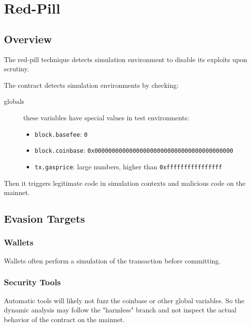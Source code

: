 \section{Red-Pill} \label{sec:red-pill}

\subsection{Overview}

The red-pill technique detects simulation environment to disable its exploits upon scrutiny. 

The contract detects simulation environments by checking:

\begin{description}
\item[globals]{these variables have special values in test environments:
\begin{itemize}
    \item{\lstinline[language=Solidity]{block.basefee}: \lstinline{0}}
    \item{\lstinline[language=Solidity]{block.coinbase}: \lstinline{0x0000000000000000000000000000000000000000}}
    \item{\lstinline[language=Solidity]{tx.gasprice}: large numbers, higher than \lstinline{0xffffffffffffffff}}
\end{itemize}}
\end{description}

Then it triggers legitimate code in simulation contexts and malicious code on the mainnet.

\subsection{Evasion Targets}

\subsubsection{Wallets}

Wallets often  perform a simulation of the transaction before committing.

\subsubsection{Security Tools}

Automatic tools will likely not fuzz the coinbase or other global variables.
So the dynamic analysis may follow the "harmless" branch and not inspect the actual behavior of the contract on the mainnet.

